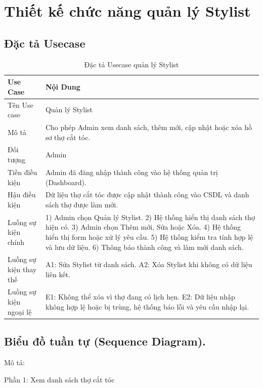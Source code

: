 \documentclass[../BTL.tex]{subfiles}
\begin{document}

\section{Thiết kế chức năng quản lý Stylist}
\subsection{Đặc tả Usecase}
\begin{longtable}{|p{}|p{}|}
\caption{Đặc tả Usecase quản lý Stylist}\label{tab:usecase-quan-ly-stylist}\\
\hline
\textbf{Use Case} & \textbf{Nội Dung} \\
\hline
Tên Use case & Quản lý Stylist \\
\hline
Mô tả & Cho phép Admin xem danh sách, thêm mới, cập nhật hoặc xóa hồ sơ thợ cắt tóc. \\
\hline
Đối tượng & Admin \\
\hline
Tiền điều kiện & Admin đã đăng nhập thành công vào hệ thống quản trị (Dashboard). \\
\hline
Hậu điều kiện & Dữ liệu thợ cắt tóc được cập nhật thành công vào CSDL và danh sách thợ được làm mới. \\
\hline
Luồng sự kiện chính & 1) Admin chọn Quản lý Stylist. 2) Hệ thống hiển thị danh sách thợ hiện có. 3) Admin chọn Thêm mới, Sửa hoặc Xóa. 4) Hệ thống hiển thị form hoặc xử lý yêu cầu. 5) Hệ thống kiểm tra tính hợp lệ và lưu dữ liệu. 6) Thông báo thành công và làm mới danh sách. \\
\hline
Luồng sự kiện thay thế & A1: Sửa Stylist từ danh sách. A2: Xóa Stylist khi không có dữ liệu liên kết. \\
\hline
Luồng sự kiện ngoại lệ & E1: Không thể xóa vì thợ đang có lịch hẹn. E2: Dữ liệu nhập không hợp lệ hoặc bị trùng, hệ thống báo lỗi và yêu cầu nhập lại. \\
\hline
\end{longtable}

\subsection{Biểu đồ tuần tự (Sequence Diagram).}

Mô tả:

Phần 1: Xem danh sách thợ cắt tóc
\end{document}
